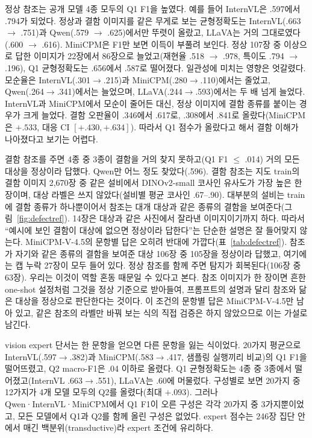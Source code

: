 \documentclass[11pt]{article}
\begin{document}
정상 참조는 공개 모델 4종 모두의 Q1 F1을 높였다. 예를 들어 InternVL은 .597에서 .794가 되었다. 정상과 결함 이미지를 같은 무게로 보는 균형정확도는 InternVL(.663 $\rightarrow$ .751)과 Qwen(.579 $\rightarrow$ .625)에서만 뚜렷이 올랐고, LLaVA는 거의 그대로였다(.600 $\rightarrow$ .616). MiniCPM은 F1만 보면 이득이 부풀려 보인다. 정상 107장 중 이상으로 답한 이미지가 22장에서 86장으로 늘었고(재현율 .518 $\rightarrow$ .978, 특이도 .794 $\rightarrow$ .196), Q1 균형정확도는 .656에서 .587로 떨어졌다. 일관성에 미치는 영향은 엇갈렸다. 모순율은 InternVL(.301$\rightarrow$.215)과 MiniCPM(.280$\rightarrow$.110)에서는 줄었고, Qwen(.264$\rightarrow$.341)에서는 늘었으며, LLaVA(.244$\rightarrow$.593)에서는 두 배 넘게 늘었다. InternVL과 MiniCPM에서 모순이 줄어든 대신, 정상 이미지에 결함 종류를 붙이는 경우가 크게 늘었다. 결함 오판율이 .346에서 .617로, .308에서 .841로 올랐다(MiniCPM은 $+.533$, 대응 CI $[+.430,+.634]$). 따라서 Q1 점수가 올랐다고 해서 결함 이해가 나아졌다고 보기는 어렵다.

결함 참조를 주면 4종 중 3종이 결함을 거의 찾지 못하고(Q1 F1 $\le$ .014) 거의 모든 대상을 정상이라 답했다. Qwen만 어느 정도 찾았다(.596). 결함 참조는 지도 train의 결함 이미지 2,670장 중 같은 설비에서 DINOv2-small 코사인 유사도가 가장 높은 한 장이며, 대상 라벨은 쓰지 않았다(설비별 평균 코사인 .67--.90). 대부분의 설비는 train에 결함 종류가 하나뿐이어서 참조는 대개 대상과 같은 종류의 결함을 보여준다(그림~\ref{fig:defectref}). 14장은 대상과 같은 사진에서 잘라낸 이미지이기까지 하다. 따라서 ``예시에 보인 결함이 대상에 없으면 정상이라 답한다''는 단순한 설명은 잘 들어맞지 않는다. MiniCPM-V-4.5의 문항별 답은 오히려 반대에 가깝다(표~\ref{tab:defectref}). 참조가 자기와 같은 종류의 결함을 보여준 대상 106장 중 105장을 정상이라 답했고, 여기에는 캡 누락 27장이 모두 들어 있다. 정상 참조를 함께 주면 탐지가 회복된다(106장 중 63장). 우리는 이것이 역할 혼동 때문일 수 있다고 본다. 참조 이미지가 한 장이면 흔한 one-shot 설정처럼 그것을 정상 기준으로 받아들여, 프롬프트의 설명과 달리 참조와 닮은 대상을 정상으로 판단한다는 것이다. 이 조건의 문항별 답은 MiniCPM-V-4.5만 남아 있고, 같은 참조의 라벨만 바꿔 보는 식의 직접 검증은 하지 않았으므로 이는 가설로 남긴다.

vision expert 단서는 한 문항을 얻으면 다른 문항을 잃는 식이었다. 20가지 평균으로 InternVL(.597$\rightarrow$.382)과 MiniCPM(.583$\rightarrow$.417, 샘플링 실행끼리 비교)의 Q1 F1을 떨어뜨렸고, Q2 macro-F1은 .04 이하로 올렸다. Q1 균형정확도는 4종 중 3종에서 떨어졌고(InternVL .663$\rightarrow$.551), LLaVA는 .60에 머물렀다. 구성별로 보면 20가지 중 12가지가 4개 모델 모두의 Q2를 올렸다(최대 $+.093$). 그러나 Qwen·InternVL·MiniCPM에서 Q1 F1이 오른 구성은 각각 20가지 중 3가지뿐이었고, 모든 모델에서 Q1과 Q2를 함께 올린 구성은 없었다. expert 점수는 246장 집단 안에서 매긴 백분위(transductive)라 expert 조건에 유리하다.
\end{document}
